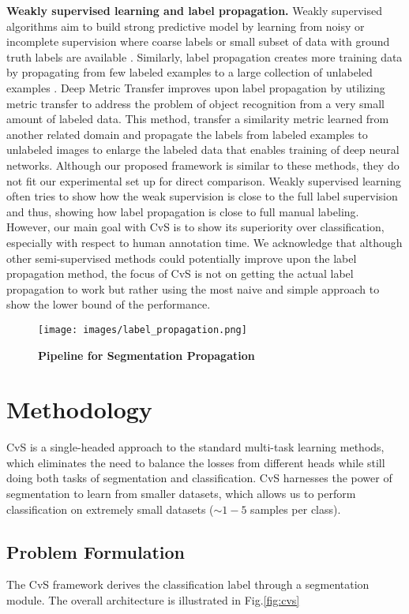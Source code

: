 \documentclass[conference]{IEEEtran}
\begin{document}
\textbf{Weakly supervised learning and label propagation.} Weakly supervised algorithms aim to build strong predictive model by learning from noisy or incomplete supervision where coarse labels or small subset of data with ground truth labels are available \cite{schwenker2014partially, hernandez2016weak, zhou2018brief}. Similarly, label propagation creates more training data by propagating from few labeled examples to a large collection of unlabeled examples \cite{xiaojin2002learning}. Deep Metric Transfer \cite{liu2019deep} improves upon label propagation by utilizing metric transfer to address the problem of object recognition from a very small amount of labeled data. This method, transfer a similarity metric learned from another related domain and propagate the labels from labeled examples to unlabeled images to enlarge the labeled data that enables training of deep neural networks. Although our proposed framework is similar to these methods, they do not fit our experimental set up for direct comparison. Weakly supervised learning often tries to show how the weak supervision is close to the full label supervision and thus, showing how label propagation is close to full manual labeling. However, our main goal with CvS is to show its superiority over classification, especially with respect to human annotation time. We acknowledge that although other semi-supervised methods could potentially improve upon the label propagation method, the focus of CvS is not on getting the actual label propagation to work but rather using the most naive and simple approach to show the lower bound of the performance.  
%
\begin{figure*}[htb]
	\centering
	\texttt{[image: images/label\_propagation.png]}
	\caption{\textbf{Pipeline for Segmentation Propagation}}
	\label{fig:seg_propagate}
\end{figure*}

\section{Methodology}
CvS is a single-headed approach to the standard multi-task learning methods, which eliminates the need to balance the losses from different heads while still doing both tasks of segmentation and classification. CvS harnesses the power of segmentation to learn from smaller datasets, which allows us to perform classification on extremely small datasets ($\sim1-5$ samples per class). 

\subsection{Problem Formulation}
The CvS framework derives the classification label through a segmentation module. The overall architecture is illustrated in Fig.\ref{fig:cvs}
\end{document}
